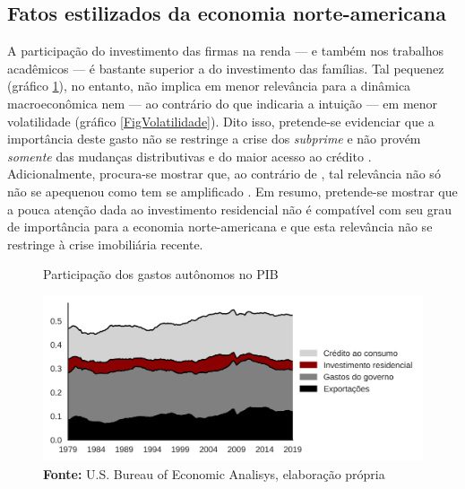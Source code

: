 \subsection{Fatos estilizados da economia norte-americana}\label{FatosEUA}



A participação do investimento das firmas na renda ---  e também nos trabalhos acadêmicos --- é bastante superior a do investimento das famílias. Tal pequenez (gráfico \ref{FigAutonomos}), no entanto, não implica em menor relevância para a dinâmica macroeconômica nem --- ao contrário do que indicaria a intuição --- em menor volatilidade (gráfico \ref{FigVolatilidade}). 
Dito isso, pretende-se evidenciar que a importância deste gasto não se restringe a crise dos \textit{subprime} e não provém \textit{somente} das mudanças distributivas \cites{zezza_u.s._2008}{cardaci_inequality_2018} e do maior acesso ao crédito \cite{mian_consequences_2009}. 
Adicionalmente, procura-se mostrar que, ao contrário de \textcite{grebler_capital_1956}, tal relevância não só não se apequenou como tem se amplificado  \cites{fiebiger_semi-autonomous_2018}{karwowski_financialisation_2019}{walther_forty_2019}.
Em resumo, pretende-se mostrar que a pouca atenção dada ao investimento residencial não é compatível com seu grau de importância para a economia norte-americana e que esta relevância não se restringe à crise imobiliária recente.




\begin{figure}[H]
	\centering
	\caption{Participação dos gastos autônomos no PIB}
	\label{FigAutonomos}
	\includegraphics[width=\textwidth]{../../Dados/Fatos_Estilizados/figs/Gastos_autonomos.png}
	\caption*{\textbf{Fonte:} U.S. Bureau of Economic Analisys, elaboração própria}
\end{figure}


